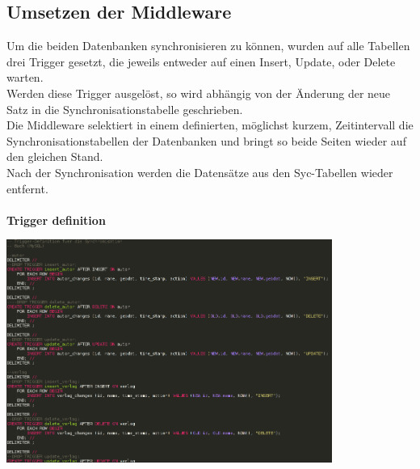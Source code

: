 \documentclass[a4paper]{article}
\begin{document}
	\newpage
	\subsection{Umsetzen der Middleware}
	Um die beiden Datenbanken synchronisieren zu können, wurden auf alle Tabellen drei Trigger gesetzt, die jeweils entweder auf einen Insert, Update, oder Delete warten.\\
	Werden diese Trigger ausgelöst, so wird abhängig von der Änderung der neue Satz in die Synchronisationstabelle geschrieben.\\
	Die Middleware selektiert in einem definierten, möglichst kurzem, Zeitintervall die Synchronisationstabellen der Datenbanken und bringt so beide Seiten wieder auf den gleichen Stand.\\
	Nach der Synchronisation werden die Datensätze aus den Syc-Tabellen wieder entfernt.\\
	\\
	\textbf{Trigger definition}
	\begin{center}
		\includegraphics[width=0.8\textwidth]{img/trigger.png}
	\end{center}
	
\end{document}
